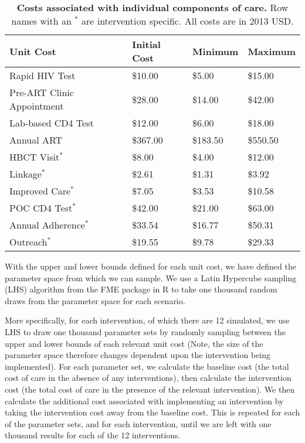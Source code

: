 \documentclass[a4paper]{article}
\begin{document}
\begin{table}[!ht]
    \centering
    \begin{tabular}{| l | l | l | l |}
        \hline
        \bf{Unit Cost} & \bf{Initial Cost} & \bf{Minimum} & \bf{Maximum} \\ \hline

        Rapid HIV Test              & \$10.00   & \$5.00    & \$15.00 \\ \hline
        Pre-ART Clinic Appointment  & \$28.00   & \$14.00   & \$42.00 \\ \hline
        Lab-based CD4 Test          & \$12.00   & \$6.00    & \$18.00 \\ \hline
        Annual ART                  & \$367.00  & \$183.50  & \$550.50 \\ \hline
        HBCT Visit$^*$              & \$8.00    & \$4.00    & \$12.00 \\ \hline
        Linkage$^*$                 & \$2.61    & \$1.31    & \$3.92 \\ \hline
        Improved Care$^*$           & \$7.05    & \$3.53    & \$10.58 \\ \hline
        POC CD4 Test$^*$            & \$42.00   & \$21.00   & \$63.00 \\ \hline
        Annual Adherence$^*$        & \$33.54   & \$16.77   & \$50.31 \\ \hline
        Outreach$^*$                & \$19.55   & \$9.78    & \$29.33 \\ \hline

    \end{tabular}
    \caption{{\bf Costs associated with individual components of care.} Row names with an $^*$ are intervention specific. All costs are in 2013 USD.}
    \label{Tabl:UnitCosts}
\end{table}

With the upper and lower bounds defined for each unit cost, we have defined the parameter space from which we can sample. We use a Latin Hypercube sampling (LHS) algorithm from the FME package in R to take one thousand random draws from the parameter space for each scenario.

More specifically, for each intervention, of which there are 12 simulated, we use LHS to draw one thousand parameter sets by randomly sampling between the upper and lower bounds of each relevant unit cost (Note, the size of the parameter space therefore changes dependent upon the intervention being implemented). For each parameter set, we calculate the baseline cost (the total cost of care in the absence of any interventions), then calculate the intervention cost (the total cost of care in the presence of the relevant intervention). We then calculate the additional cost associated with implementing an intervention by taking the intervention cost away from the baseline cost. This is repeated for each of the parameter sets, and for each intervention, until we are left with one thousand results for each of the 12 interventions.
\end{document}
